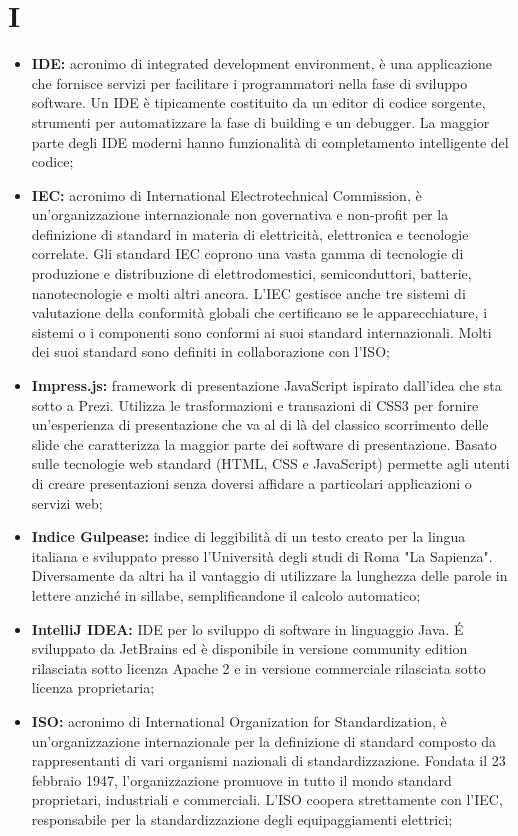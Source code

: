 \section*{I} %
\label{sec:i}
	\begin{itemize}
		\item \textbf{IDE:} acronimo di integrated development environment, è una applicazione che fornisce servizi per facilitare i programmatori nella fase di sviluppo software. Un IDE è tipicamente costituito da un editor di codice sorgente, strumenti per automatizzare la fase di building e un debugger. La maggior parte degli IDE moderni hanno funzionalità di completamento intelligente del codice;
		\item \textbf{IEC:} acronimo di International Electrotechnical Commission, è un'organizzazione internazionale non governativa e non-profit per la definizione di standard in materia di elettricità, elettronica e tecnologie correlate. Gli standard IEC coprono una vasta gamma di tecnologie di produzione e distribuzione di elettrodomestici, semiconduttori, batterie, nanotecnologie e molti altri ancora. L'IEC gestisce anche tre sistemi di valutazione della conformità globali che certificano se le apparecchiature, i sistemi o i componenti sono conformi ai suoi standard internazionali. Molti dei suoi standard sono definiti in collaborazione con l'ISO;
		\item \textbf{Impress.js:} framework di presentazione JavaScript ispirato dall'idea che sta sotto a Prezi. Utilizza le trasformazioni e transazioni di CSS3 per fornire un'esperienza di presentazione che va al di là del classico scorrimento delle slide che caratterizza la maggior parte dei software di presentazione. Basato sulle tecnologie web standard (HTML, CSS e JavaScript) permette agli utenti di creare presentazioni senza doversi affidare a particolari applicazioni o servizi web;
		\item \textbf{Indice Gulpease:} indice di leggibilità di un testo creato per la lingua italiana e sviluppato presso l'Università degli studi di Roma "La Sapienza". Diversamente da altri ha il vantaggio di utilizzare la lunghezza delle parole in lettere anziché in sillabe, semplificandone il calcolo automatico;
		\item \textbf{IntelliJ IDEA:} IDE per lo sviluppo di software in linguaggio Java. É sviluppato da JetBrains ed è disponibile in versione community edition rilasciata sotto licenza Apache 2 e in versione commerciale rilasciata sotto licenza proprietaria;
		\item \textbf{ISO:} acronimo di International Organization for Standardization, è un'organizzazione internazionale per la definizione di standard composto da rappresentanti di vari organismi nazionali di standardizzazione. Fondata il 23 febbraio 1947, l'organizzazione promuove in tutto il mondo standard proprietari, industriali e commerciali. L'ISO coopera strettamente con l'IEC, responsabile per la standardizzazione degli equipaggiamenti elettrici;
	\end{itemize}
\pagebreak

